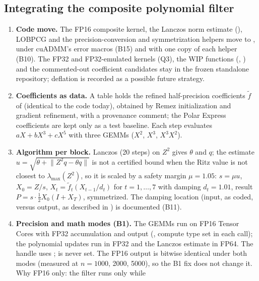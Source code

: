 \documentclass[11pt]{article}
\newcommand{\norm}[1]{\lVert #1\rVert}
\begin{document}
\subsection{Integrating the composite polynomial filter}\label{sec:composite}
\begin{enumerate}
  \item \textbf{Code move.} The FP16 composite kernel, the Lanczos norm estimate
  (), LOBPCG and the precision-conversion and symmetrization helpers move to
  , under cuADMM's error macros (B15) and with one copy of each helper (B10). The
  FP32 and FP32-emulated kernels (Q3), the WIP functions (,
  ) and the commented-out coefficient candidates stay in the frozen standalone
  repository; deflation is recorded as a possible future strategy.
  \item \textbf{Coefficients as data.} A  table  holds the refined
  half-precision coefficients $\tilde f$ of \cite[Table~2]{composite}
  (identical to the code today), obtained by Remez initialization and gradient refinement, with a provenance
  comment; the Polar Express coefficients \cite{polarexpress} are kept only as a test baseline. Each step
  evaluates $aX + bX^3 + cX^5$ with three GEMMs ($X^2$, $X^3$, $X^3X^2$).
  \item \textbf{Algorithm per block.} Lanczos (20 steps) on $Z^2$ gives $\theta$ and $q$; the estimate
  $u = \sqrt{\theta + \norm{Z^2q - \theta q}}$ \cite[Theorem~2]{composite} is not a certified bound when the
  Ritz value is not closest to $\lambda_{\max}(Z^2)$, so it is scaled by a safety margin $\mu = 1.05$:
  $s = \mu u$, $X_0 = Z/s$, $X_t = \tilde f_t(X_{t-1}/d_t)$ for $t = 1,\dots,7$ with damping $d_t = 1.01$, result
  $P = s\cdot\tfrac12 X_0(I + X_T)$, symmetrized. The damping
  location (input, as coded, versus output, as described in \cite[\S3.4]{composite}) is documented (B11).
  \item \textbf{Precision and math modes (B1).} The GEMMs run on FP16 Tensor Cores with FP32 accumulation and
  output (, compute type  set in each call); the polynomial
  updates run in FP32 and the Lanczos estimate in FP64. The handle uses ;
   is never set. The FP16 output is bitwise identical under both modes (measured at
  $n = 1000$, 2000, 5000), so the B1 fix does not change it. Why FP16 only: the filter runs only while

\end{enumerate}
\end{document}
